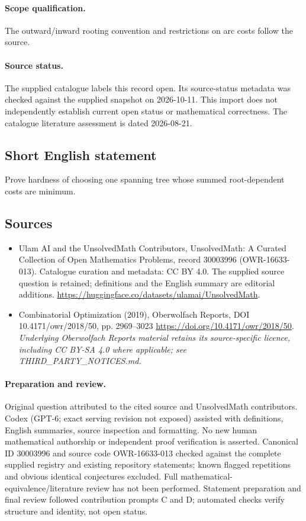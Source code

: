 \documentclass[11pt]{article}
\begin{document}
\paragraph{Scope qualification.}
The outward/inward rooting convention and restrictions on arc costs follow the source.
\paragraph{Source status.}
The supplied catalogue labels this record open. Its source-status metadata was checked against the supplied snapshot on 2026-10-11. This import does not independently establish current open status or mathematical correctness. The catalogue literature assessment is dated 2026-08-21.
\subsection{Short English statement}
Prove hardness of choosing one spanning tree whose summed root-dependent costs are minimum.
\subsection{Sources}
\begin{itemize}
\item[\hypertarget{source:30003996:1}{S1}] Ulam AI and the UnsolvedMath Contributors, UnsolvedMath: A Curated Collection of Open Mathematics Problems, record 30003996 (OWR-16633-013). Catalogue curation and metadata: CC BY 4.0. The supplied source question is retained; definitions and the English summary are editorial additions.
\url{https://huggingface.co/datasets/ulamai/UnsolvedMath}.
\item[\hypertarget{source:30003996:2}{S2}] Combinatorial Optimization (2019), Oberwolfach Reports, DOI 10.4171/owr/2018/50, pp. 2969--3023
\url{https://doi.org/10.4171/owr/2018/50}.
\textit{Underlying Oberwolfach Reports material retains its source-specific licence, including CC BY-SA 4.0 where applicable; see THIRD\_PARTY\_NOTICES.md.}
\end{itemize}
\paragraph{Preparation and review.}
Original question attributed to the cited source and UnsolvedMath contributors. Codex (GPT-6; exact serving revision not exposed) assisted with definitions, English summaries, source inspection and formatting. No new human mathematical authorship or independent proof verification is asserted. Canonical ID 30003996 and source code OWR-16633-013 checked against the complete supplied registry and existing repository statements; known flagged repetitions and obvious identical conjectures excluded. Full mathematical-equivalence/literature review has not been performed. Statement preparation and final review followed contribution prompts C and D; automated checks verify structure and identity, not open status.
\label{end:30003996}
\end{document}
